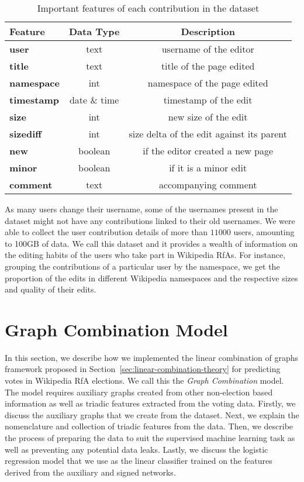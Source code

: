 \begin{table}[htp]
    \centering
    \caption{Important features of each contribution in the \usercontrib dataset}
    \label{tab:usercontrib-features}
    \begin{tabular}{lcc}
        \toprule
        Feature & Data Type & Description\\
        \midrule
        \textbf{user}&text& username of the editor\\
        \textbf{title}&text & title of the page edited\\
        \textbf{namespace}&int& namespace of the page edited\\
        \textbf{timestamp}&date \& time & timestamp of the edit\\
        \textbf{size}&int& new size of the edit \\
        \textbf{sizediff}& int & size delta of the edit against its parent\\
        \textbf{new}&boolean &if the editor created a new page \\
        \textbf{minor}&boolean& if it is a minor edit\\
        \textbf{comment}& text& accompanying comment\\
        \bottomrule
    \end{tabular}
\end{table}
As many users change their username, some of the usernames present in the \wikirfa dataset might not have any contributions linked to their old usernames.
We were able to collect the user contribution details of more than $11000$ users, amounting to 100GB of data.
We call this dataset \usercontrib and it provides a wealth of information on the editing habits of the users who take part in Wikipedia RfAs. 
For instance, grouping the contributions of a particular user by the namespace, we get the proportion of the edits in different Wikipedia namespaces and the respective sizes and quality of their edits.

\section{Graph Combination Model}
\label{sec:linear-combination-implementation}
In this section, we describe how we implemented the linear combination of graphs framework proposed in Section~\ref{sec:linear-combination-theory} for predicting votes in Wikipedia RfA elections.
We call this the \textit{Graph Combination} model.
The model requires auxiliary graphs created from other non-election based information as well as triadic features extracted from the voting data.
Firstly, we discuss the auxiliary graphs that we create from the \usercontrib dataset.
Next, we explain the nomenclature and collection of triadic features from the \wikirfa data.
Then, we describe the process of preparing the data to suit the supervised machine learning task as well as preventing any potential data leaks.
Lastly, we discuss the logistic regression model that we use as the linear classifier trained on the features derived from the auxiliary and signed networks.

